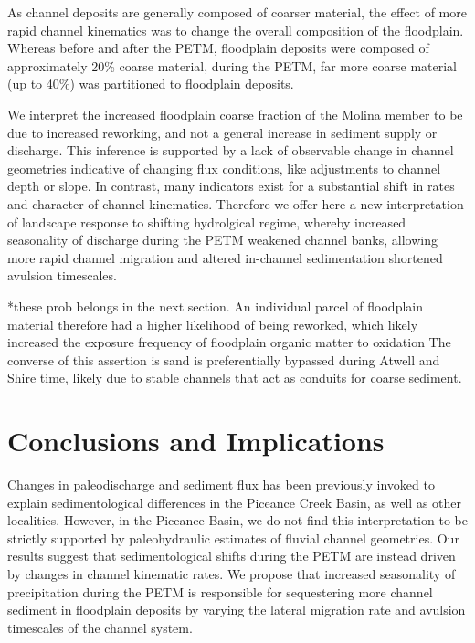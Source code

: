\documentclass[draft]{compact_proposal}
\begin{document}
As channel deposits are generally composed of coarser material, the effect of more rapid channel kinematics was to change the overall composition of the floodplain.
Whereas before and after the PETM, floodplain deposits were composed of approximately 20\% coarse material, during the PETM, far more coarse material (up to 40\%) was partitioned to floodplain deposits.

We interpret the increased floodplain coarse fraction of the Molina member to be due to increased reworking, and not a general increase in sediment supply or discharge.
This inference is supported by a lack of observable change in channel geometries indicative of changing flux conditions, like adjustments to channel depth or slope.
In contrast, many indicators exist for a substantial shift in rates and character of channel kinematics.
Therefore we offer here a new interpretation of landscape response to shifting hydrolgical regime, whereby increased seasonality of discharge during the PETM weakened channel banks, allowing more rapid channel migration and altered in-channel sedimentation shortened avulsion timescales.

*these prob belongs in the next section.
  An individual parcel of floodplain material therefore had a higher likelihood of being reworked, which likely increased the exposure frequency of floodplain organic matter to oxidation
  The converse of this assertion is sand is preferentially bypassed during Atwell and Shire time, likely due to stable channels that act as conduits for coarse sediment.

\section{Conclusions and Implications}

Changes in paleodischarge and sediment flux has been previously invoked to explain sedimentological differences in the Piceance Creek Basin, as well as other localities.
However, in the Piceance Basin, we do not find this interpretation to be strictly supported by paleohydraulic estimates of fluvial channel geometries.
Our results suggest that sedimentological shifts during the PETM are instead driven by changes in channel kinematic rates.
We propose that increased seasonality of precipitation during the PETM is responsible for sequestering more channel sediment in floodplain deposits by varying the lateral migration rate and avulsion timescales of the channel system.
\end{document}
